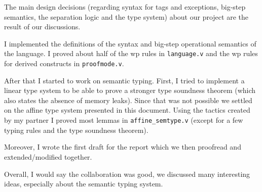 \documentclass{article}
\begin{document}
The main design decisions (regarding syntax for tags and exceptions, big-step semantics, the separation logic and the type system) about our project are the
result of our discussions.

I implemented the definitions of the syntax and big-step operational semantics of the language. I proved about half of the wp rules in \texttt{language.v} and
the wp rules for derived constructs in \texttt{proofmode.v}.

After that I started to work on semantic typing. First, I tried to implement a linear type system to be able to prove a stronger type soundness theorem
(which also states the absence of memory leaks). Since that was not possible we settled on the affine type system presented in this document.
Using the tactics created by my partner I proved most lemmas in \texttt{affine\_semtype.v} (except for a few typing rules and the type soundness theorem).

Moreover, I wrote the first draft for the report which we then proofread and extended/modified together.

Overall, I would say the collaboration was good, we discussed many interesting ideas, especially about the semantic typing system.
\end{document}
